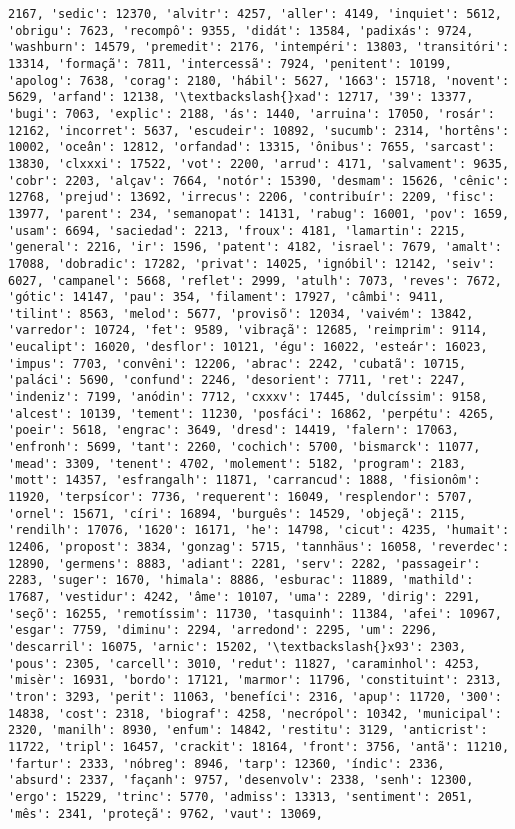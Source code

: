 \begin{Verbatim}[commandchars=\\\{\}]
2167, 'sedic': 12370, 'alvitr': 4257, 'aller': 4149, 'inquiet': 5612, 'obrigu': 7623, 'recompô': 9355, 'didát': 13584, 'padixás': 9724, 'washburn': 14579, 'premedit': 2176, 'intempéri': 13803, 'transitóri': 13314, 'formaçã': 7811, 'intercessã': 7924, 'penitent': 10199, 'apolog': 7638, 'corag': 2180, 'hábil': 5627, '1663': 15718, 'novent': 5629, 'arfand': 12138, '\textbackslash{}xad': 12717, '39': 13377, 'bugi': 7063, 'explic': 2188, 'ás': 1440, 'arruina': 17050, 'rosár': 12162, 'incorret': 5637, 'escudeir': 10892, 'sucumb': 2314, 'hortêns': 10002, 'oceân': 12812, 'orfandad': 13315, 'ônibus': 7655, 'sarcast': 13830, 'clxxxi': 17522, 'vot': 2200, 'arrud': 4171, 'salvament': 9635, 'cobr': 2203, 'alçav': 7664, 'notór': 15390, 'desmam': 15626, 'cênic': 12768, 'prejud': 13692, 'irrecus': 2206, 'contribuír': 2209, 'fisc': 13977, 'parent': 234, 'semanopat': 14131, 'rabug': 16001, 'pov': 1659, 'usam': 6694, 'saciedad': 2213, 'froux': 4181, 'lamartin': 2215, 'general': 2216, 'ir': 1596, 'patent': 4182, 'israel': 7679, 'amalt': 17088, 'dobradic': 17282, 'privat': 14025, 'ignóbil': 12142, 'seiv': 6027, 'campanel': 5668, 'reflet': 2999, 'atulh': 7073, 'reves': 7672, 'gótic': 14147, 'pau': 354, 'filament': 17927, 'câmbi': 9411, 'tilint': 8563, 'melod': 5677, 'provisõ': 12034, 'vaivém': 13842, 'varredor': 10724, 'fet': 9589, 'vibraçã': 12685, 'reimprim': 9114, 'eucalipt': 16020, 'desflor': 10121, 'égu': 16022, 'esteár': 16023, 'impus': 7703, 'convêni': 12206, 'abrac': 2242, 'cubatã': 10715, 'paláci': 5690, 'confund': 2246, 'desorient': 7711, 'ret': 2247, 'indeniz': 7199, 'anódin': 7712, 'cxxxv': 17445, 'dulcíssim': 9158, 'alcest': 10139, 'tement': 11230, 'posfáci': 16862, 'perpétu': 4265, 'poeir': 5618, 'engrac': 3649, 'dresd': 14419, 'falern': 17063, 'enfronh': 5699, 'tant': 2260, 'cochich': 5700, 'bismarck': 11077, 'mead': 3309, 'tenent': 4702, 'molement': 5182, 'program': 2183, 'mott': 14357, 'esfrangalh': 11871, 'carrancud': 1888, 'fisionôm': 11920, 'terpsícor': 7736, 'requerent': 16049, 'resplendor': 5707, 'ornel': 15671, 'círi': 16894, 'burguês': 14529, 'objeçã': 2115, 'rendilh': 17076, '1620': 16171, 'he': 14798, 'cicut': 4235, 'humait': 12406, 'propost': 3834, 'gonzag': 5715, 'tannhäus': 16058, 'reverdec': 12890, 'germens': 8883, 'adiant': 2281, 'serv': 2282, 'passageir': 2283, 'suger': 1670, 'himala': 8886, 'esburac': 11889, 'mathild': 17687, 'vestidur': 4242, 'âme': 10107, 'uma': 2289, 'dirig': 2291, 'seçõ': 16255, 'remotíssim': 11730, 'tasquinh': 11384, 'afei': 10967, 'esgar': 7759, 'diminu': 2294, 'arredond': 2295, 'um': 2296, 'descarril': 16075, 'arnic': 15202, '\textbackslash{}x93': 2303, 'pous': 2305, 'carcell': 3010, 'redut': 11827, 'caraminhol': 4253, 'misèr': 16931, 'bordo': 17121, 'marmor': 11796, 'constituint': 2313, 'tron': 3293, 'perit': 11063, 'benefíci': 2316, 'apup': 11720, '300': 14838, 'cost': 2318, 'biograf': 4258, 'necrópol': 10342, 'municipal': 2320, 'manilh': 8930, 'enfum': 14842, 'restitu': 3129, 'anticrist': 11722, 'tripl': 16457, 'crackit': 18164, 'front': 3756, 'antã': 11210, 'fartur': 2333, 'nóbreg': 8946, 'tarp': 12360, 'índic': 2336, 'absurd': 2337, 'façanh': 9757, 'desenvolv': 2338, 'senh': 12300, 'ergo': 15229, 'trinc': 5770, 'admiss': 13313, 'sentiment': 2051, 'mês': 2341, 'proteçã': 9762, 'vaut': 13069, 
\end{Verbatim}
